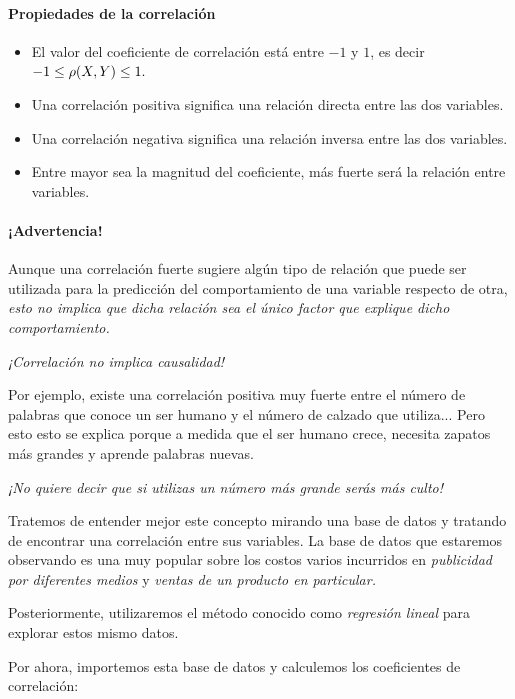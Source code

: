 \paragraph{Propiedades de la correlación}
\begin{itemize}
 \item El valor del coeficiente de correlación está entre $-1$ y $1$, es decir $-1\leq  \rho(X,Y)  \leq 1.$ 
 \item Una correlación positiva significa una relación directa entre las dos variables. 
 \item Una correlación negativa significa una relación inversa entre las dos variables. 
 \item Entre mayor sea la magnitud del coeficiente, más fuerte será la relación entre variables.
\end{itemize}


\paragraph{¡Advertencia!}
Aunque una correlación fuerte sugiere algún tipo de relación que puede ser utilizada para la predicción del comportamiento de una variable respecto de otra, \emph{esto no implica que dicha relación sea el único factor que explique dicho comportamiento.}


 \begin{rem}
  \emph{¡Correlación no implica causalidad!}
 \end{rem}



 Por ejemplo, existe una correlación positiva muy fuerte entre el número de palabras que conoce un ser humano y el número de calzado que utiliza...  Pero esto esto se explica porque a medida que el ser humano crece, necesita zapatos más grandes y aprende palabras nuevas. 

 \emph{¡No quiere decir que si utilizas un número más grande serás más culto!}


Tratemos de entender mejor este concepto mirando una base de datos y tratando de encontrar una correlación entre sus variables.  La base de datos que estaremos observando es una muy popular sobre los costos varios incurridos en \emph{publicidad por diferentes medios} y \emph{ventas de un producto en particular.}


Posteriormente, utilizaremos el método conocido como \emph{regresión lineal} para explorar estos mismo datos.

Por ahora, importemos esta base de datos y calculemos los coeficientes de correlación:

